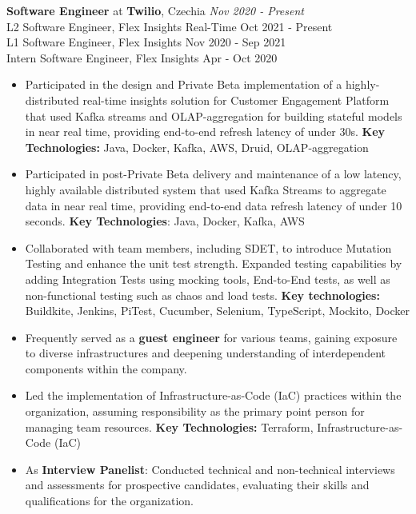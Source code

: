 
{\textbf{Software Engineer} at \textbf{Twilio}, Czechia} 
    \hfill {\em Nov 2020 - Present}\\
    {L2 Software Engineer, Flex Insights Real-Time} \hfill  {Oct 2021 - Present}\\
    {L1 Software Engineer, Flex Insights} \hfill            {Nov 2020 - Sep 2021}\\
    {Intern Software Engineer, Flex Insights} \hfill        {Apr - Oct 2020}
    \begin{itemize}
        \item Participated in the design and Private Beta implementation of a highly-distributed real-time insights solution for Customer Engagement Platform that used Kafka streams and OLAP-aggregation for building stateful models in near real time, providing end-to-end refresh latency of under 30s. \textbf{Key Technologies:} Java, Docker, Kafka, AWS, Druid, OLAP-aggregation
        \item Participated in post-Private Beta delivery and maintenance of a low latency, highly available distributed system that used Kafka Streams to aggregate data in near real time, providing end-to-end data refresh latency of under 10 seconds. \textbf{Key Technologies}: Java, Docker, Kafka, AWS
        \item Collaborated with team members, including SDET, to introduce Mutation Testing and enhance the unit test strength. Expanded testing capabilities by adding Integration Tests using mocking tools, End-to-End tests, as well as non-functional testing such as chaos and load tests. \textbf{Key technologies:} Buildkite, Jenkins, PiTest, Cucumber, Selenium, TypeScript, Mockito, Docker
        \item Frequently served as a \textbf{guest engineer} for various teams, gaining exposure to diverse infrastructures and deepening understanding of interdependent components within the company.
        \item Led the implementation of Infrastructure-as-Code (IaC) practices within the organization, assuming responsibility as the primary point person for managing team resources. \textbf{Key Technologies:} Terraform, Infrastructure-as-Code (IaC)
        \item As \textbf{Interview Panelist}: Conducted technical and non-technical interviews and assessments for prospective candidates, evaluating their skills and qualifications for the organization.

\end{itemize}
